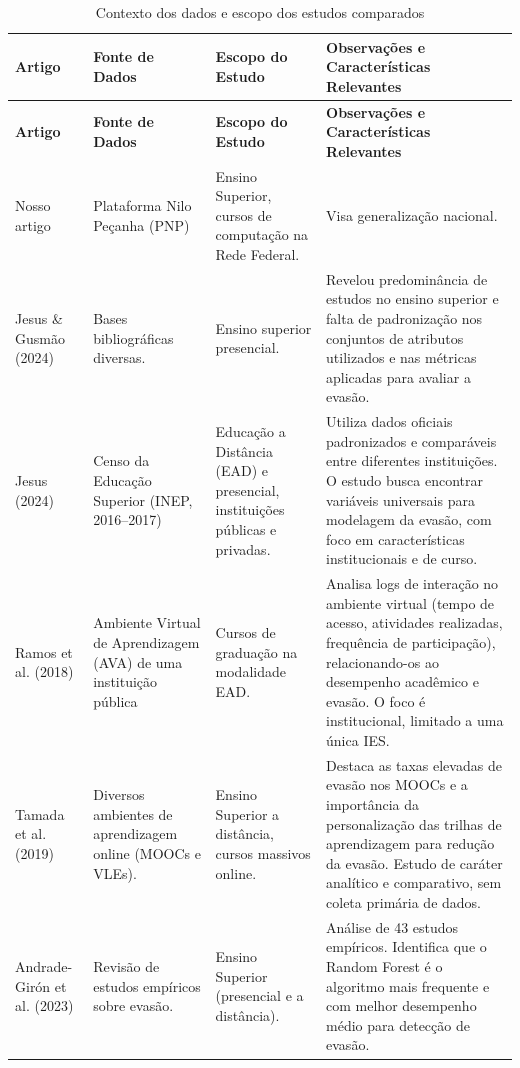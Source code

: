 \documentclass[english, spanish, brazilian]{RBIEarticle} %
\begin{document}
\begin{longtable}{|p{3cm}|p{3.5cm}|p{4.5cm}|p{5cm}|}
    \caption{Contexto dos dados e escopo dos estudos comparados}\\
    \toprule
    \textbf{Artigo} & \textbf{Fonte de Dados} & \textbf{Escopo do Estudo} & \textbf{Observações e Características Relevantes} \\
    \midrule
    \endfirsthead
    \toprule
    \textbf{Artigo} & \textbf{Fonte de Dados} & \textbf{Escopo do Estudo} & \textbf{Observações e Características Relevantes} \\
    \midrule
    \endhead
    Nosso artigo & Plataforma Nilo Peçanha (PNP) & Ensino Superior, cursos de computação na Rede Federal. & Visa generalização nacional. \\ \hline
    
    Jesus \& Gusmão (2024) & Bases bibliográficas diversas. & Ensino superior presencial. & Revelou predominância de estudos no ensino superior e falta de padronização nos conjuntos de atributos utilizados e nas métricas aplicadas para avaliar a evasão. \\ \hline
    
    Jesus (2024) & Censo da Educação Superior (INEP, 2016–2017) & Educação a Distância (EAD) e presencial, instituições públicas e privadas. & Utiliza dados oficiais padronizados e comparáveis entre diferentes instituições. O estudo busca encontrar variáveis universais para modelagem da evasão, com foco em características institucionais e de curso. \\ \hline
    
    Ramos et al. (2018) & Ambiente Virtual de Aprendizagem (AVA) de uma instituição pública & Cursos de graduação na modalidade EAD. & Analisa logs de interação no ambiente virtual (tempo de acesso, atividades realizadas, frequência de participação), relacionando-os ao desempenho acadêmico e evasão. O foco é institucional, limitado a uma única IES. \\ \hline
    
    Tamada et al. (2019) & Diversos ambientes de aprendizagem online (MOOCs e VLEs). & Ensino Superior a distância, cursos massivos online. & Destaca as taxas elevadas de evasão nos MOOCs e a importância da personalização das trilhas de aprendizagem para redução da evasão. Estudo de caráter analítico e comparativo, sem coleta primária de dados. \\ \hline
    
    Andrade-Girón et al. (2023) & Revisão de estudos empíricos sobre evasão. & Ensino Superior (presencial e a distância). & Análise de 43 estudos empíricos. Identifica que o Random Forest é o algoritmo mais frequente e com melhor desempenho médio para detecção de evasão. \\ \hline
    

\end{longtable}
\end{document}
